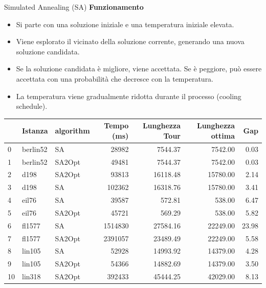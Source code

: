 \documentclass{beamer}
\begin{document}
\begin{frame}{Simulated Annealing (SA)}
    \textbf{Funzionamento}
    \begin{itemize}
        \item Si parte con una soluzione iniziale e una temperatura iniziale elevata.
        \item Viene esplorato il vicinato della soluzione corrente, generando una nuova soluzione candidata.
        \item Se la soluzione candidata è migliore, viene accettata. Se è peggiore, può essere accettata con una probabilità che decresce con la temperatura.
        \item La temperatura viene gradualmente ridotta durante il processo (cooling schedule).
    \end{itemize}
    \begin{table}[H]
        \centering
        \begin{tabular}{lllrrrr}
            \toprule
               & Istanza  & algorithm & Tempo (ms) & Lunghezza Tour & Lunghezza ottima & Gap   \\
            \midrule
            0  & berlin52 & SA        & 28982      & 7544.37        & 7542.00          & 0.03  \\
            1  & berlin52 & SA2Opt    & 49481      & 7544.37        & 7542.00          & 0.03  \\
            2  & d198     & SA2Opt    & 93813      & 16118.48       & 15780.00         & 2.14  \\
            3  & d198     & SA        & 102362     & 16318.76       & 15780.00         & 3.41  \\
            4  & eil76    & SA        & 39587      & 572.81         & 538.00           & 6.47  \\
            5  & eil76    & SA2Opt    & 45721      & 569.29         & 538.00           & 5.82  \\
            6  & fl1577   & SA        & 1514830    & 27584.16       & 22249.00         & 23.98 \\
            7  & fl1577   & SA2Opt    & 2391057    & 23489.49       & 22249.00         & 5.58  \\
            8  & lin105   & SA        & 52928      & 14993.92       & 14379.00         & 4.28  \\
            9  & lin105   & SA2Opt    & 54366      & 14882.69       & 14379.00         & 3.50  \\
            10 & lin318   & SA2Opt    & 392433     & 45444.25       & 42029.00         & 8.13  \\

\end{tabular}
\end{table}
\end{frame}
\end{document}
